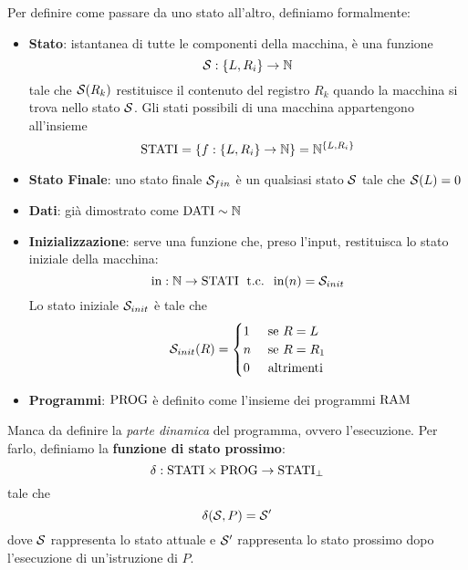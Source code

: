 Per definire come passare da uno stato all'altro, definiamo formalmente: 
\begin{itemize}
	\item \textbf{Stato}: istantanea di tutte le componenti della macchina, è una funzione 
	$$ \mathcal{S}: \{L, R_i\} \rightarrow \mathbb{N} $$
	tale che $\mathcal{S} (R_k)$ restituisce il contenuto del registro $R_k$ quando la macchina si trova nello stato $\mathcal{S}$. Gli stati possibili di una macchina appartengono all'insieme 
	$$ \text{STATI} = \{f: \{L, R_i\} \rightarrow \mathbb{N}\} = \mathbb{N}^{\{L,R_i\}} $$
	
	\item \textbf{Stato Finale}: uno stato finale $\mathcal{S}_{fin}$ è un qualsiasi stato $\mathcal{S}$ tale che $\mathcal{S} (L) = 0$
	\item \textbf{Dati}: già dimostrato come $\text{DATI} \sim \mathbb{N}$
	\item \textbf{Inizializzazione}: serve una funzione che, preso l'input, restituisca lo stato iniziale della macchina: 
	$$ \text{in}: \mathbb{N} \rightarrow \text{STATI} \; \text{ t.c. } \; \text{in}(n) = \mathcal{S}_{init}$$
	Lo stato iniziale $\mathcal{S}_{init}$ è tale che 
	$$ 
	\mathcal{S}_{init} (R) = \begin{cases}
		1 & \text{ se } R=L \\
		n & \text{ se } R=R_1 \\
		0 & \text{ altrimenti}
	\end{cases}
	$$
	\item \textbf{Programmi}: $\text{PROG}$ è definito come l'insieme dei programmi $\text{RAM}$
\end{itemize}

Manca da definire la \textit{parte dinamica} del programma, ovvero l'esecuzione. Per farlo, definiamo la \textbf{funzione di stato prossimo}: 
$$ \delta : \text{STATI} \times \text{PROG} \rightarrow \text{STATI}_\bot $$
tale che 
$$ \delta (\mathcal{S},P) = \mathcal{S}' $$
dove $\mathcal{S}$ rappresenta lo stato attuale e $\mathcal{S}'$ rappresenta lo stato prossimo dopo l'esecuzione di un'istruzione di $P$.\\

